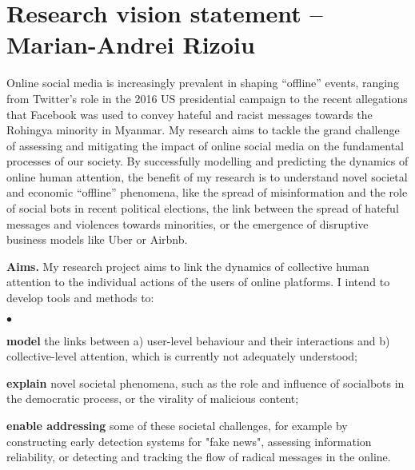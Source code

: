 \documentclass[12pt]{article}
\newcommand{\secmoveup}{\vspace{-2.5mm}} %
\newcommand{\squishlist}{
 \begin{list}{$\bullet$}
  { \setlength{\itemsep}{0pt}
     \setlength{\parsep}{3pt}
     \setlength{\topsep}{3pt}
     \setlength{\partopsep}{0pt}
     \setlength{\leftmargin}{1.5em}
     \setlength{\labelwidth}{1em}
     \setlength{\labelsep}{0.5em} } }
\newcommand{\squishend}{
  \end{list}  }
\begin{document}
\section*{Research vision statement -- Marian-Andrei Rizoiu} 
%

Online social media is increasingly prevalent in shaping ``offline'' events, ranging from Twitter's role in the 2016 US presidential campaign to the recent allegations that Facebook was used to convey hateful and racist messages towards the Rohingya minority in Myanmar.
My research aims to tackle the grand challenge of assessing and mitigating the impact of online social media on the fundamental processes of our society.
By successfully modelling and predicting the dynamics of online human attention, the benefit of my research is to understand novel societal and economic ``offline'' phenomena, like the spread of misinformation and the role of social bots in recent political elections, the link between the spread of hateful messages and violences towards minorities, or the emergence of disruptive business models like Uber or Airbnb.

\textbf{Aims.}
My research project aims to link the dynamics of collective human attention to the individual actions of the users of online platforms.
I intend to develop tools and methods to:
\vspace{-.3cm}
\squishlist
	\item \textbf{model} the links between a) user-level behaviour and their interactions and b) collective-level attention, which is currently not adequately understood;
	\item \textbf{explain} novel societal phenomena, such as the role and influence of socialbots in the democratic process, or the virality of malicious content;
	\item \textbf{enable addressing} some of these societal challenges, for example by constructing early detection systems for "fake news", assessing information reliability, or detecting and tracking the flow of radical messages in the online.
\squishend
\end{document}
